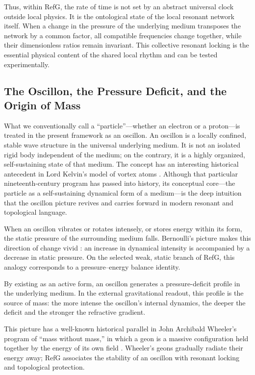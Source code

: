 \documentclass[11pt,a4paper]{article}
\begin{document}
Thus, within RefG, the rate of time is not set by an abstract universal clock outside local physics. It is the ontological state of the local resonant network itself. When a change in the pressure of the underlying medium transposes the network by a common factor, all compatible frequencies change together, while their dimensionless ratios remain invariant. This collective resonant locking is the essential physical content of the shared local rhythm and can be tested experimentally.

\subsection{The Oscillon, the Pressure Deficit, and the Origin of Mass}

What we conventionally call a ``particle''---whether an electron or a proton---is treated in the present framework as an oscillon. An oscillon is a locally confined, stable wave structure in the universal underlying medium. It is not an isolated rigid body independent of the medium; on the contrary, it is a highly organized, self-sustaining state of that medium. The concept has an interesting historical antecedent in Lord Kelvin's model of vortex atoms \citep{thomson1867}. Although that particular nineteenth-century program has passed into history, its conceptual core---the particle as a self-sustaining dynamical form of a medium---is the deep intuition that the oscillon picture revives and carries forward in modern resonant and topological language.

When an oscillon vibrates or rotates intensely, or stores energy within its form, the static pressure of the surrounding medium falls. Bernoulli's picture makes this direction of change vivid \citep{bernoulli1738}: an increase in dynamical intensity is accompanied by a decrease in static pressure. On the selected weak, static branch of RefG, this analogy corresponds to a pressure--energy balance identity.

By existing as an active form, an oscillon generates a pressure-deficit profile in the underlying medium. In the external gravitational readout, this profile is the source of mass: the more intense the oscillon's internal dynamics, the deeper the deficit and the stronger the refractive gradient.

This picture has a well-known historical parallel in John Archibald Wheeler's program of ``mass without mass,'' in which a geon is a massive configuration held together by the energy of its own field \citep{wheeler1955}. Wheeler's geons gradually radiate their energy away; RefG associates the stability of an oscillon with resonant locking and topological protection.
\end{document}
